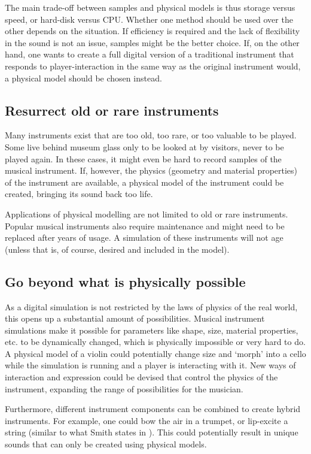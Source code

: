 The main trade-off between samples and physical models is thus storage versus speed, or hard-disk versus CPU. Whether one method should be used over the other depends on the situation. If efficiency is required and the lack of flexibility in the sound is not an issue, samples might be the better choice. If, on the other hand, one wants to create a full digital version of a traditional instrument that responds to player-interaction in the same way as the original instrument would, a physical model should be chosen instead.

\subsection{Resurrect old or rare instruments}
Many instruments exist that are too old, too rare, or too valuable to be played. Some live behind museum glass only to be looked at by visitors, never to be played again. In these cases, it might even be hard to record samples of the musical instrument. If, however, the physics (geometry and material properties) of the instrument are available, a physical model of the instrument could be created, bringing its sound back too life.

Applications of physical modelling are not limited to old or rare instruments. Popular musical instruments also require maintenance and might need to be replaced after years of usage. A simulation of these instruments will not age (unless that is, of course, desired and included in the model).

\subsection{Go beyond what is physically possible}\label{sec:impossible}
As a digital simulation is not restricted by the laws of physics of the real world, this opens up a substantial amount of possibilities.
Musical instrument simulations make it possible for parameters like shape, size, material properties, etc. to be dynamically changed, which is physically impossible or very hard to do. A physical model of a violin could potentially change size and `morph' into a cello while the simulation is running and a player is interacting with it. New ways of interaction and expression could be devised that control the physics of the instrument, expanding the range of possibilities for the musician. 

Furthermore, different instrument components can be combined to create hybrid instruments. For example, one could bow the air in a trumpet, or lip-excite a string (similar to what Smith states in \cite{Smith2010a}). This could potentially result in unique sounds that can only be created using physical models.

